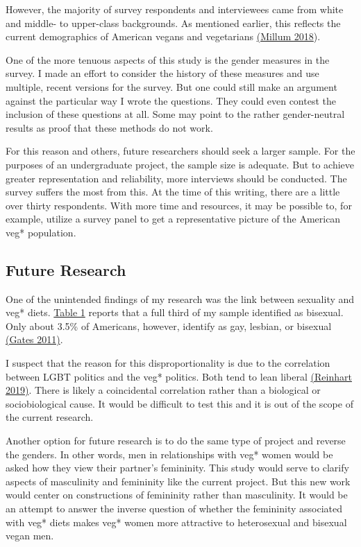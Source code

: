 \documentclass[twoside]{report}
\begin{document}
However, the majority of survey respondents and interviewees came from white and middle- to upper-class backgrounds. As mentioned earlier, this reflects the current demographics of American vegans and vegetarians \hyperlink{millum}{(Millum 2018}).

One of the more tenuous aspects of this study is the gender measures in the survey. I made an effort to consider the history of these measures and use multiple, recent versions for the survey. But one could still make an argument against the particular way I wrote the questions. They could even contest the inclusion of these questions at all. Some may point to the rather gender-neutral results as proof that these methods do not work.

For this reason and others, future researchers should seek a larger sample. For the purposes of an undergraduate project, the sample size is adequate. But to achieve greater representation and reliability, more interviews should be conducted. The survey suffers the most from this. At the time of this writing, there are a little over thirty respondents. With more time and resources, it may be possible to, for example, utilize a survey panel to get a representative picture of the American veg* population.

\hypertarget{future-research}{\subsection{Future Research}}

One of the unintended findings of my research was the link between sexuality and veg* diets. \hyperlink{table-1}{Table 1} reports that a full third of my sample identified as bisexual. Only about 3.5\% of Americans, however, identify as gay, lesbian, or bisexual \hyperlink{gates}{(Gates 2011)}.

I suspect that the reason for this disproportionality is due to the correlation between LGBT politics and the veg* politics. Both tend to lean liberal \hyperlink{reinhart}{(Reinhart 2019)}. There is likely a coincidental correlation rather than a biological or sociobiological cause. It would be difficult to test this and it is out of the scope of the current research.

Another option for future research is to do the same type of project and reverse the genders. In other words, men in relationships with veg* women would be asked how they view their partner's femininity. This study would serve to clarify aspects of masculinity and femininity like the current project. But this new work would center on constructions of femininity rather than masculinity. It would be an attempt to answer the inverse question of whether the femininity associated with veg* diets makes veg* women more attractive to heterosexual and bisexual vegan men.
\end{document}
